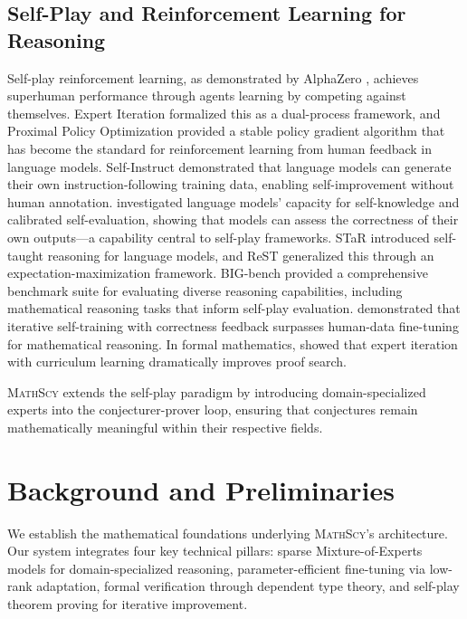 \documentclass[11pt,a4paper]{article}
\newcommand{\mathscy}{\textsc{MathScy}}
\begin{document}
\subsection{Self-Play and Reinforcement Learning for Reasoning}

Self-play reinforcement learning, as demonstrated by AlphaZero \citep{silver2017mastering}, achieves superhuman performance through agents learning by competing against themselves. Expert Iteration \citep{anthony2017thinking} formalized this as a dual-process framework, and Proximal Policy Optimization \citep{schulman2017proximal} provided a stable policy gradient algorithm that has become the standard for reinforcement learning from human feedback in language models. Self-Instruct \citep{wang2023selfinstruct} demonstrated that language models can generate their own instruction-following training data, enabling self-improvement without human annotation. \citet{kadavath2022language} investigated language models' capacity for self-knowledge and calibrated self-evaluation, showing that models can assess the correctness of their own outputs---a capability central to self-play frameworks. STaR \citep{zelikman2022star} introduced self-taught reasoning for language models, and ReST \citep{gulcehre2023rest} generalized this through an expectation-maximization framework. BIG-bench \citep{srivastava2023beyond} provided a comprehensive benchmark suite for evaluating diverse reasoning capabilities, including mathematical reasoning tasks that inform self-play evaluation. \cite{singh2024beyond} demonstrated that iterative self-training with correctness feedback surpasses human-data fine-tuning for mathematical reasoning. In formal mathematics, \cite{polu2023formal} showed that expert iteration with curriculum learning dramatically improves proof search.

\mathscy{} extends the self-play paradigm by introducing domain-specialized experts into the conjecturer-prover loop, ensuring that conjectures remain mathematically meaningful within their respective fields.


\section{Background and Preliminaries}
\label{sec:background}

We establish the mathematical foundations underlying \mathscy{}'s architecture. Our system integrates four key technical pillars: sparse Mixture-of-Experts models for domain-specialized reasoning, parameter-efficient fine-tuning via low-rank adaptation, formal verification through dependent type theory, and self-play theorem proving for iterative improvement.
\end{document}
